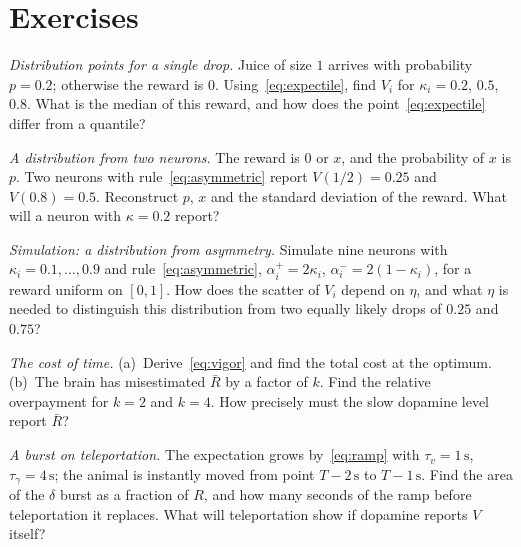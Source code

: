 \section{Exercises}

\begin{exercise}[\lvlA]
\label{ex:07:1}
\emph{Distribution points for a single drop.} Juice of size $1$ arrives with probability $p=0.2$; otherwise the reward is $0$. Using~\eqref{eq:expectile}, find $V_i$ for $\kappa_i=0.2$, $0.5$, $0.8$. What is the median of this reward, and how does the point~\eqref{eq:expectile} differ from a quantile?
\end{exercise}

\begin{exercise}[\lvlB]
\label{ex:07:2}
\emph{A distribution from two neurons.} The reward is $0$ or $x$, and the probability of $x$ is $p$. Two neurons with rule~\eqref{eq:asymmetric} report $V(1/2)=0.25$ and $V(0.8)=0.5$. Reconstruct $p$, $x$ and the standard deviation of the reward. What will a neuron with $\kappa=0.2$ report?
\end{exercise}

\begin{exercise}[\lvlB]
\label{ex:07:3}
\emph{Simulation: a distribution from asymmetry.} Simulate nine  neurons with $\kappa_i=0.1,\dots,0.9$ and rule~\eqref{eq:asymmetric}, $\alpha_i^+=2\kappa_i$, $\alpha_i^-=2(1-\kappa_i)$, for a reward uniform on $[0,1]$. How does the scatter of $V_i$ depend on $\eta$, and what $\eta$ is needed to distinguish this distribution from two equally likely drops of $0.25$ and $0.75$?
\end{exercise}

\begin{exercise}[\lvlA]
\label{ex:07:4}
\emph{The cost of time.} (a)~Derive~\eqref{eq:vigor} and find the total cost at the optimum. (b)~The brain has misestimated $\bar R$ by a factor of $k$. Find the relative overpayment for $k=2$ and $k=4$. How precisely must the slow dopamine level report $\bar R$?
\end{exercise}

\begin{exercise}[\lvlB]
\label{ex:07:5}
\emph{A burst on teleportation.} The expectation grows by~\eqref{eq:ramp} with $\tau_v=1\,\text{s}$, $\tau_\gamma=4\,\text{s}$; the animal is instantly moved from point $T-2\,\text{s}$ to $T-1\,\text{s}$. Find the area of the $\delta$ burst as a fraction of $R$, and how many seconds of the ramp before teleportation it replaces. What will teleportation show if dopamine reports $V$ itself?
\end{exercise}

